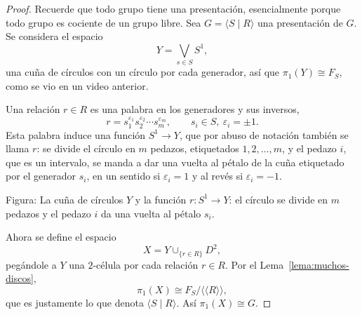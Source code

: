 \documentclass[11pt]{article}
\begin{document}
\begin{proof}
Recuerde que todo grupo tiene una presentación, esencialmente porque todo grupo es cociente de un grupo libre. Sea $G=\langle S\mid R\rangle$ una presentación de $G$. Se considera el espacio
\[
  Y=\bigvee_{s\in S}S^1,
\]
una cuña de círculos con un círculo por cada generador, así que $\pi_1(Y)\cong F_S$, como se vio en un video anterior.

Una relación $r\in R$ es una palabra en los generadores y sus inversos,
\[
  r=s_1^{\varepsilon_1}s_2^{\varepsilon_2}\cdots s_m^{\varepsilon_m},\qquad s_i\in S,\ \varepsilon_i=\pm1.
\]
Esta palabra induce una función $S^1\to Y$, que por abuso de notación también se llama $r$: se divide el círculo en $m$ pedazos, etiquetados $1,2,\dots,m$, y el pedazo $i$, que es un intervalo, se manda a dar una vuelta al pétalo de la cuña etiquetado por el generador $s_i$, en un sentido si $\varepsilon_i=1$ y al revés si $\varepsilon_i=-1$.

\begin{center}
\end{center}

\noindent Figura: La cuña de círculos $Y$ y la función $r\colon S^1\to Y$: el círculo se divide en $m$ pedazos y el pedazo $i$ da una vuelta al pétalo $s_i$.

Ahora se define el espacio
\[
  X=Y\cup_{\{r\in R\}}D^2,
\]
pegándole a $Y$ una $2$-célula por cada relación $r\in R$. Por el Lema~\ref{lema:muchos-discos},
\[
  \pi_1(X)\cong F_S\big/\langle\!\langle R\rangle\!\rangle,
\]
que es justamente lo que denota $\langle S\mid R\rangle$. Así $\pi_1(X)\cong G$.
\end{proof}
\end{document}
